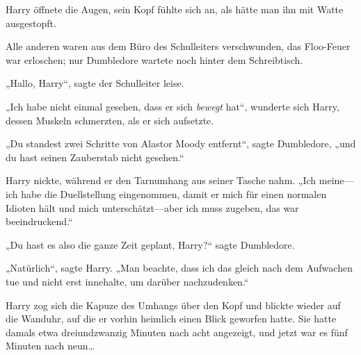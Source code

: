\later

Harry öffnete die Augen, sein Kopf fühlte sich an, als hätte man ihn mit Watte ausgestopft.

Alle anderen waren aus dem Büro des Schulleiters verschwunden, das Floo-Feuer war erloschen; nur Dumbledore wartete noch hinter dem Schreibtisch.

„Hallo, Harry“, sagte der Schulleiter leise.

„Ich habe nicht einmal gesehen, dass er sich \emph{bewegt} hat“, wunderte sich Harry, dessen Muskeln schmerzten, als er sich aufsetzte.

„Du standest zwei Schritte von Alastor Moody entfernt“, sagte Dumbledore, „und du hast seinen Zauberstab nicht gesehen.“

Harry nickte, während er den Tarnumhang aus seiner Tasche nahm. „Ich meine—ich habe die Duellstellung eingenommen, damit er mich für einen normalen Idioten hält und mich unterschätzt—aber ich muss zugeben, das war beeindruckend.“

„Du hast es also die ganze Zeit geplant, Harry?“ sagte Dumbledore.

„Natürlich“, sagte Harry. „Man beachte, dass ich das gleich nach dem Aufwachen tue und nicht erst innehalte, um darüber nachzudenken.“


Harry zog sich die Kapuze des Umhangs über den Kopf und blickte wieder auf die Wanduhr, auf die er vorhin heimlich einen Blick geworfen hatte. Sie hatte damals etwa dreiundzwanzig Minuten nach acht angezeigt, und jetzt war es fünf Minuten nach neun…


